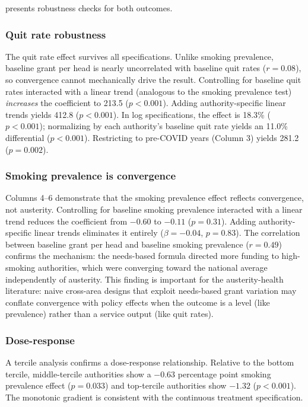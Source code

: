 \documentclass[12pt]{article}
\begin{document}
 presents robustness checks for both outcomes.

\subsubsection*{Quit rate robustness} The quit rate effect survives all specifications. Unlike smoking prevalence, baseline grant per head is nearly uncorrelated with baseline quit rates ($r = 0.08$), so convergence cannot mechanically drive the result. Controlling for baseline quit rates interacted with a linear trend (analogous to the smoking prevalence test) \textit{increases} the coefficient to 213.5 ($p < 0.001$). Adding authority-specific linear trends yields 412.8 ($p < 0.001$). In log specifications, the effect is 18.3\% ($p < 0.001$); normalizing by each authority's baseline quit rate yields an 11.0\% differential ($p < 0.001$). Restricting to pre-COVID years (Column 3) yields 281.2 ($p = 0.002$).

\subsubsection*{Smoking prevalence is convergence} Columns 4--6 demonstrate that the smoking prevalence effect reflects convergence, not austerity. Controlling for baseline smoking prevalence interacted with a linear trend reduces the coefficient from $-0.60$ to $-0.11$ ($p = 0.31$). Adding authority-specific linear trends eliminates it entirely ($\beta = -0.04$, $p = 0.83$). The correlation between baseline grant per head and baseline smoking prevalence ($r = 0.49$) confirms the mechanism: the needs-based formula directed more funding to high-smoking authorities, which were converging toward the national average independently of austerity. This finding is important for the austerity-health literature: naive cross-area designs that exploit needs-based grant variation may conflate convergence with policy effects when the outcome is a level (like prevalence) rather than a service output (like quit rates).

\subsubsection*{Dose-response} A tercile analysis confirms a dose-response relationship. Relative to the bottom tercile, middle-tercile authorities show a $-0.63$ percentage point smoking prevalence effect ($p = 0.033$) and top-tercile authorities show $-1.32$ ($p < 0.001$). The monotonic gradient is consistent with the continuous treatment specification.
\end{document}
